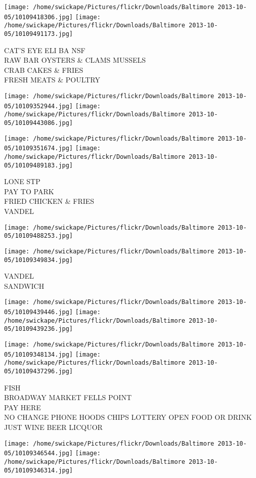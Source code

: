 \documentclass[10pt,letterpaper]{article}
\begin{document}
\texttt{[image: /home/swickape/Pictures/flickr/Downloads/Baltimore 2013-10-05/10109418306.jpg]}
\texttt{[image: /home/swickape/Pictures/flickr/Downloads/Baltimore 2013-10-05/10109491173.jpg]}

CAT'S EYE ELI BA NSF\\
RAW BAR OYSTERS \& CLAMS MUSSELS\\
CRAB CAKES \& FRIES\\
FRESH MEATS \& POULTRY
\pagebreak

\texttt{[image: /home/swickape/Pictures/flickr/Downloads/Baltimore 2013-10-05/10109352944.jpg]}
\texttt{[image: /home/swickape/Pictures/flickr/Downloads/Baltimore 2013-10-05/10109443086.jpg]}

\texttt{[image: /home/swickape/Pictures/flickr/Downloads/Baltimore 2013-10-05/10109351674.jpg]}
\texttt{[image: /home/swickape/Pictures/flickr/Downloads/Baltimore 2013-10-05/10109489183.jpg]}

LONE STP\\
PAY TO PARK\\
FRIED CHICKEN \& FRIES\\
VANDEL
\pagebreak

\texttt{[image: /home/swickape/Pictures/flickr/Downloads/Baltimore 2013-10-05/10109488253.jpg]}

\vspace{0.25in}
\texttt{[image: /home/swickape/Pictures/flickr/Downloads/Baltimore 2013-10-05/10109349834.jpg]}

VANDEL\\
SANDWICH
\pagebreak

\texttt{[image: /home/swickape/Pictures/flickr/Downloads/Baltimore 2013-10-05/10109439446.jpg]}
\texttt{[image: /home/swickape/Pictures/flickr/Downloads/Baltimore 2013-10-05/10109439236.jpg]}

\texttt{[image: /home/swickape/Pictures/flickr/Downloads/Baltimore 2013-10-05/10109348134.jpg]}
\texttt{[image: /home/swickape/Pictures/flickr/Downloads/Baltimore 2013-10-05/10109437296.jpg]}

FISH\\
BROADWAY MARKET FELLS POINT\\
PAY HERE\\
NO CHANGE PHONE HOODS CHIPS LOTTERY OPEN FOOD OR DRINK JUST WINE BEER LICQUOR
\pagebreak

\texttt{[image: /home/swickape/Pictures/flickr/Downloads/Baltimore 2013-10-05/10109346544.jpg]}
\texttt{[image: /home/swickape/Pictures/flickr/Downloads/Baltimore 2013-10-05/10109346314.jpg]}
\end{document}
